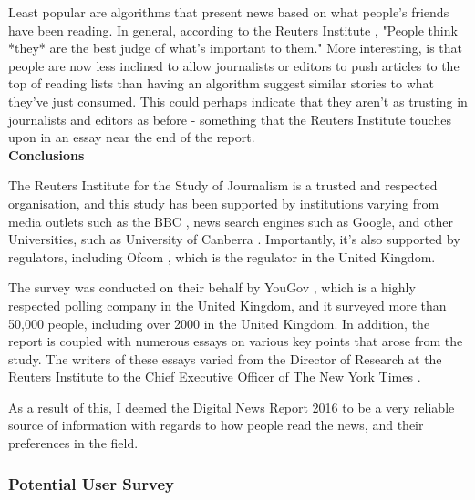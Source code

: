 \documentclass[12pt]{article}
\begin{document}
Least popular are algorithms that present news based on what people's friends have been reading. In general, according to the Reuters Institute \cite{reutersInstitute}, "People think *they* are the best judge of what's important to them." More interesting, is that people are now less inclined to allow journalists or editors to push articles to the top of reading lists than having an algorithm suggest similar stories to what they've just consumed. This could perhaps indicate that they aren't as trusting in journalists and editors as before - something that the Reuters Institute touches upon in an essay near the end of the report. \\

\textbf{Conclusions}

The Reuters Institute for the Study of Journalism is a trusted and respected organisation, and this study has been supported by institutions varying from media outlets such as the BBC \cite{bbc}, news search engines such as Google, and other Universities, such as University of Canberra \cite{canberra}. Importantly, it's also supported by regulators, including Ofcom \cite{ofcom}, which is the regulator in the United Kingdom. 

The survey was conducted on their behalf by YouGov \cite{yougov}, which is a highly respected polling company in the United Kingdom, and it surveyed more than 50,000 people, including over 2000 in the United Kingdom. In addition, the report is coupled with numerous essays on various key points that arose from the study. The writers of these essays varied from the Director of Research at the Reuters Institute to the Chief Executive Officer of The New York Times \cite{newYorkTimes}.

As a result of this, I deemed the Digital News Report 2016 \cite{digitalNewsReport} to be a very reliable source of information with regards to how people read the news, and their preferences in the field. 

\subsubsection{Potential User Survey}
\end{document}
